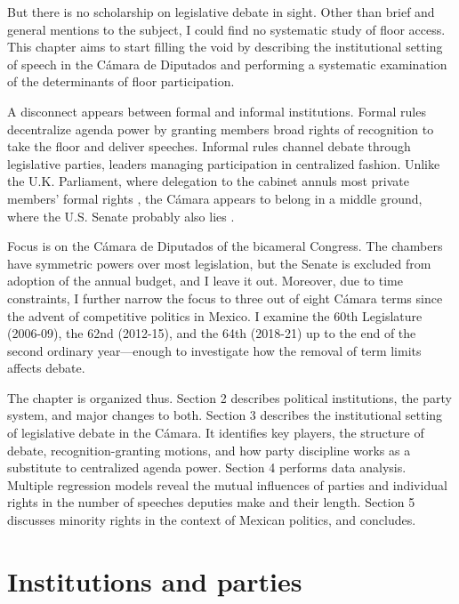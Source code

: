 \documentclass[letter,12pt]{article}
\begin{document}
But there is no scholarship on legislative debate in sight. Other than brief and general mentions to the subject, I could find no systematic study of floor access. This chapter aims to start filling the void by describing the institutional setting of speech in the Cámara de Diputados and performing a systematic examination of the determinants of floor participation.

A disconnect appears between formal and informal institutions. Formal rules decentralize agenda power by granting members broad rights of recognition to take the floor and deliver speeches. Informal rules channel debate through legislative parties, leaders managing participation in centralized fashion. Unlike the U.K. Parliament, where delegation to the cabinet annuls most private members' formal rights \citep{cox.1987}, the Cámara appears to belong in a middle ground, where the U.S. Senate probably also lies \citep{denhartog.monroe.SenateBook.2011}.

Focus is on the Cámara de Diputados of the bicameral Congress. The chambers have symmetric powers over most legislation, but the Senate is excluded from adoption of the annual budget, and I leave it out. Moreover, due to time constraints, I further narrow the focus to three out of eight Cámara terms since the advent of competitive politics in Mexico. I examine the 60th Legislature (2006-09), the 62nd (2012-15), and the 64th (2018-21) up to the end of the second ordinary year---enough to investigate how the removal of term limits affects debate.

The chapter is organized thus. Section 2 describes political institutions, the party system, and major changes to both. Section 3 describes the institutional setting of legislative debate in the Cámara. It identifies key players, the structure of debate, recognition-granting motions, and how party discipline works as a substitute to centralized agenda power. Section 4 performs data analysis. Multiple regression models reveal the mutual influences of parties and individual rights in the number of speeches deputies make and their length. Section 5 discusses minority rights in the context of Mexican politics, and concludes. 

\section{Institutions and parties} %

\end{document}
